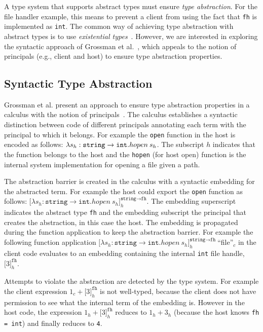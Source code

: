 \documentclass{article}
\newcommand{\emb}[3]{\texttt{[}#1\texttt{]}_{#2}^{#3}}
\newcommand{\quotes}[1]{``#1''}
\newcommand\icode[1]{\texttt{#1}}
\begin{document}
A type system that supports abstract types must ensure \emph{type abstraction}. For the file handler example, this means to prevent a client from using the fact that \texttt{fh} is implemented as \texttt{int}. The common way of achieving type abstraction with abstract types is to use \emph{existential types}~\cite{mitchellPlotkin:toplas1988}. However, we are interested in exploring the syntactic approach of Grossman et al.~\cite{grossmanAl:toplas2000}, which appeals to the notion of principals (e.g., {\sf client} and {\sf host}) to ensure type abstraction properties. 
	
	\subsection{Syntactic Type Abstraction}\label{section:sta}
	Grossman et al. present an approach to ensure type abstraction properties in a calculus with the notion of principals~\cite{grossmanAl:toplas2000}. The calculus establishes a syntactic distinction between code of different principals annotating each term with the principal to which it belongs. For example the \icode{open} function in the host is encoded as follows: $\lambda s_h:{\tt string} \rightarrow {\tt int}.hopen \: s_h$. The subscript $h$ indicates that the function belongs to the host and the \icode{hopen} (for host open) function is the internal system implementation for opening a file given a path. 
	
	The abstraction barrier is created in the calculus with a syntactic embedding for the abstracted term. For example the host could export the \icode{open} function as follows: $\emb{\lambda s_h:\icode{string} \rightarrow \icode{int}.hopen \: s_h}{h}{\texttt{string} \rightarrow \texttt{fh}}$. The embedding superscript indicates the abstract type \texttt{fh} and the embedding subscript the principal that creates the abstraction, in this case the {\sf host}.  The embedding is propagated during the function application to keep the abstraction barrier. For example the following function application $\emb{\lambda s_h:\icode{string} \rightarrow \icode{int}.hopen \: s_h}{h}{\texttt{string} \rightarrow \texttt{fh}} \: $\quotes{file}$_c$ in the client code evaluates to an embedding containing the internal \icode{int} file handle, $\emb{3}{h}{\texttt{fh}}$. 
	
	Attempts to violate the abstraction are detected by the type system. For example the client expression $1_c + \emb{3}{h}{\texttt{fh}}$ is not well-typed, because the client does not have permission to see what the internal term of the embedding is. However in the host code, the expression $1_h + \emb{3}{h}{\texttt{fh}}$ reduces to $1_h + 3_h$ (because the host knows \icode{fh = int}) and finally reduces to \icode{4}.
	
\end{document}
